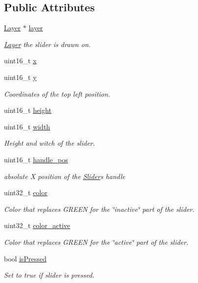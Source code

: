 \subsection*{Public Attributes}
\begin{DoxyCompactItemize}
\item 
\mbox{\hyperlink{struct_layer}{Layer}} $\ast$ \mbox{\hyperlink{group__sprite_gaed3e78bd2a3a88c5b0a02ff128d8dd85}{layer}}
\begin{DoxyCompactList}\small\item\em \mbox{\hyperlink{struct_layer}{Layer}} the slider is drawn on. \end{DoxyCompactList}\item 
uint16\+\_\+t \mbox{\hyperlink{group__sprite_ga3f0f16473e1534d0d73d917e6212b4f1}{x}}
\item 
uint16\+\_\+t \mbox{\hyperlink{group__sprite_ga4568c992e8bb68bfdf407242af502928}{y}}
\begin{DoxyCompactList}\small\item\em Coordinates of the top left position. \end{DoxyCompactList}\item 
uint16\+\_\+t \mbox{\hyperlink{group__sprite_gaa0b70313a61d3490712dc4c269e0bea4}{height}}
\item 
uint16\+\_\+t \mbox{\hyperlink{group__sprite_ga4ccd5dd9d8b0c329101310f2dd24fbe5}{width}}
\begin{DoxyCompactList}\small\item\em Height and witch of the slider. \end{DoxyCompactList}\item 
uint16\+\_\+t \mbox{\hyperlink{group__sprite_gac1256085ee6a3241fb177a28befc0eef}{handle\+\_\+pos}}
\begin{DoxyCompactList}\small\item\em absolute X position of the \mbox{\hyperlink{struct_slider}{Slider}}\textquotesingle{}s handle \end{DoxyCompactList}\item 
uint32\+\_\+t \mbox{\hyperlink{group__sprite_ga0ec90999b2ad7a80de51ebbf6603af87}{color}}
\begin{DoxyCompactList}\small\item\em Color that replaces G\+R\+E\+EN for the \char`\"{}inactive\char`\"{} part of the slider. \end{DoxyCompactList}\item 
uint32\+\_\+t \mbox{\hyperlink{group__sprite_ga30afc9a607e8770d283f7219d837bfc2}{color\+\_\+active}}
\begin{DoxyCompactList}\small\item\em Color that replaces G\+R\+E\+EN for the \char`\"{}active\char`\"{} part of the slider. \end{DoxyCompactList}\item 
bool \mbox{\hyperlink{group__sprite_gafebb65462372e968ef98ad909aa6413a}{is\+Pressed}}
\begin{DoxyCompactList}\small\item\em Set to true if slider is pressed. \end{DoxyCompactList}\end{DoxyCompactItemize}


